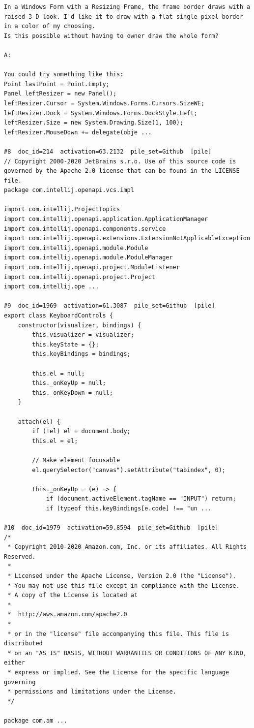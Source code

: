 \begin{verbatim}
In a Windows Form with a Resizing Frame, the frame border draws with a raised 3-D look. I'd like it to draw with a flat single pixel border in a color of my choosing.
Is this possible without having to owner draw the whole form?

A:

You could try something like this:
Point lastPoint = Point.Empty;
Panel leftResizer = new Panel();
leftResizer.Cursor = System.Windows.Forms.Cursors.SizeWE;
leftResizer.Dock = System.Windows.Forms.DockStyle.Left;
leftResizer.Size = new System.Drawing.Size(1, 100);
leftResizer.MouseDown += delegate(obje ...

#8  doc_id=214  activation=63.2132  pile_set=Github  [pile]
// Copyright 2000-2020 JetBrains s.r.o. Use of this source code is governed by the Apache 2.0 license that can be found in the LICENSE file.
package com.intellij.openapi.vcs.impl

import com.intellij.ProjectTopics
import com.intellij.openapi.application.ApplicationManager
import com.intellij.openapi.components.service
import com.intellij.openapi.extensions.ExtensionNotApplicableException
import com.intellij.openapi.module.Module
import com.intellij.openapi.module.ModuleManager
import com.intellij.openapi.project.ModuleListener
import com.intellij.openapi.project.Project
import com.intellij.ope ...

#9  doc_id=1969  activation=61.3087  pile_set=Github  [pile]
export class KeyboardControls {
    constructor(visualizer, bindings) {
        this.visualizer = visualizer;
        this.keyState = {};
        this.keyBindings = bindings;

        this.el = null;
        this._onKeyUp = null;
        this._onKeyDown = null;
    }

    attach(el) {
        if (!el) el = document.body;
        this.el = el;

        // Make element focusable
        el.querySelector("canvas").setAttribute("tabindex", 0);

        this._onKeyUp = (e) => {
            if (document.activeElement.tagName == "INPUT") return;
            if (typeof this.keyBindings[e.code] !== "un ...

#10  doc_id=1979  activation=59.8594  pile_set=Github  [pile]
/*
 * Copyright 2010-2020 Amazon.com, Inc. or its affiliates. All Rights Reserved.
 *
 * Licensed under the Apache License, Version 2.0 (the "License").
 * You may not use this file except in compliance with the License.
 * A copy of the License is located at
 *
 *  http://aws.amazon.com/apache2.0
 *
 * or in the "license" file accompanying this file. This file is distributed
 * on an "AS IS" BASIS, WITHOUT WARRANTIES OR CONDITIONS OF ANY KIND, either
 * express or implied. See the License for the specific language governing
 * permissions and limitations under the License.
 */

package com.am ...

\end{verbatim}

